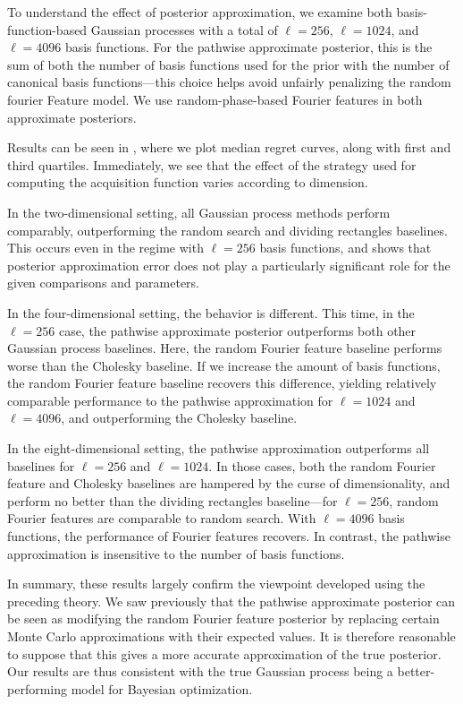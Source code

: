 \documentclass[11pt]{book}
\begin{document}
To understand the effect of posterior approximation, we examine both basis-function-based Gaussian processes with a total of $\ell = 256$, $\ell = 1024$, and $\ell = 4096$ basis functions.
For the pathwise approximate posterior, this is the sum of both the number of basis functions used for the prior with the number of canonical basis functions---this choice helps avoid unfairly penalizing the random fourier Feature model.
We use random-phase-based Fourier features in both approximate posteriors.

Results can be seen in , where we plot median regret curves, along with first and third quartiles.
Immediately, we see that the effect of the strategy used for computing the acquisition function varies according to dimension.

In the two-dimensional setting, all Gaussian process methods perform comparably, outperforming the random search and dividing rectangles baselines.
This occurs even in the regime with $\ell = 256$ basis functions, and shows that posterior approximation error does not play a particularly significant role for the given comparisons and parameters.

In the four-dimensional setting, the behavior is different.
This time, in the $\ell = 256$ case, the pathwise approximate posterior outperforms both other Gaussian process baselines.
Here, the random Fourier feature baseline performs worse than the Cholesky baseline.
If we increase the amount of basis functions, the random Fourier feature baseline recovers this difference, yielding relatively comparable performance to the pathwise approximation for $\ell = 1024$ and $\ell = 4096$, and outperforming the Cholesky baseline.

In the eight-dimensional setting, the pathwise approximation outperforms all baselines for $\ell = 256$ and $\ell = 1024$.
In those cases, both the random Fourier feature and Cholesky baselines are hampered by the curse of dimensionality, and perform no better than the dividing rectangles baseline---for $\ell = 256$, random Fourier features are comparable to random search.
With $\ell = 4096$ basis functions, the performance of Fourier features recovers.
In contrast, the pathwise approximation is insensitive to the number of basis functions.

In summary, these results largely confirm the viewpoint developed using the preceding theory.
We saw previously that the pathwise approximate posterior can be seen as modifying the random Fourier feature posterior by replacing certain Monte Carlo approximations with their expected values.
It is therefore reasonable to suppose that this gives a more accurate approximation of the true posterior.
Our results are thus consistent with the true Gaussian process being a better-performing model for Bayesian optimization.
\end{document}
